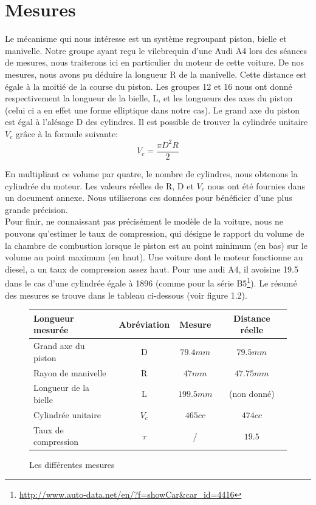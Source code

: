 \documentclass[a4paper,oneside,12pt]{report}
\begin{document}

\section{Mesures}

Le mécanisme qui nous intéresse est un système regroupant piston, bielle et manivelle. Notre groupe ayant reçu le vilebrequin d'une Audi A4 lors des séances de mesures, nous traiterons ici en particulier du moteur de cette voiture. De nos mesures, nous avons pu déduire la longueur R de la manivelle. Cette distance est égale à la moitié de la course du piston. Les groupes 12 et 16 nous ont donné respectivement la longueur de la bielle, L, et les longueurs des axes du piston (celui ci a en effet une forme elliptique dans notre cas). Le grand axe du piston est égal à l'alésage D des cylindres. Il est possible de trouver la cylindrée unitaire $V_c$ grâce à la formule suivante: 
$$V_c =\frac{\pi D^2 R}{2}$$

En multipliant ce volume par quatre, le nombre de cylindres, nous obtenons la cylindrée du moteur. Les valeurs réelles de R, D et $V_c$ nous ont été fournies dans un document annexe. Nous utiliserons ces données pour bénéficier d'une plus grande précision.\\

Pour finir, ne connaissant pas précisément le modèle de la voiture, nous ne pouvons qu'estimer le taux de compression, qui désigne le rapport du volume de la chambre de combustion lorsque le piston est au point minimum (en bas) sur le volume au point maximum (en haut). Une voiture dont le moteur fonctionne au diesel, a un taux de compression assez haut. Pour une audi A4, il avoisine 19.5 dans le cas d'une cylindrée égale à 1896 (comme pour la série
B5\footnote{\url{http://www.auto-data.net/en/?f=showCar&car_id=4416}}). Le résumé des mesures se trouve dans le tableau ci-dessous (voir figure 1.2).

\begin{figure}[h]
\centering
\begin{tabular}{|l|c|c|c|}
  \hline
  Longueur mesurée & Abréviation & Mesure & Distance réelle\\
  \hline
  Grand axe du piston & D & $79.4mm$ & $79.5mm$ \\
  Rayon de manivelle & R & $47mm$ & $47.75mm$\\
  Longueur de la bielle & L & $199.5mm$ & (non donné)\\
  Cylindrée unitaire & $V_c$  & $465cc$ & $474cc$\\
  Taux de compression & $\tau$ & / & $19.5$\\
  \hline
\end{tabular}
\caption{Les différentes mesures}
\end{figure}
\end{document}
